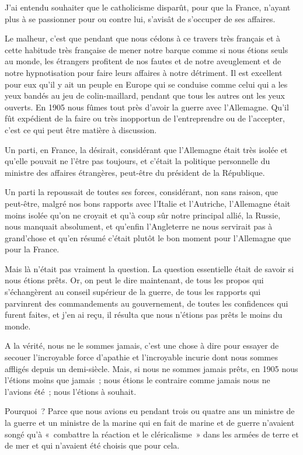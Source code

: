 \documentclass[french,twoside]{book} %
\begin{document}
J’ai entendu souhaiter que le catholicisme disparût, pour que la France, n’ayant plus à se passionner pour ou contre lui, s’avisât de s’occuper de ses affaires.\par
Le malheur, c’est que pendant que nous cédons à ce travers très français et à cette habitude très française de mener notre barque comme si nous étions seuls au monde, les étrangers profitent de nos fautes et de notre aveuglement et de notre hypnotisation pour faire leurs affaires à notre détriment. Il est excellent pour eux qu’il y ait un peuple en Europe qui se conduise comme celui qui a les yeux bandés au jeu de colin-maillard, pendant que tous les autres ont les yeux ouverts. En 1905 nous fûmes tout près d’avoir la guerre avec l’Allemagne. Qu’il fût expédient de la faire ou très inopportun de l’entreprendre ou de l’accepter, c’est ce qui peut être matière à discussion.\par
Un parti, en France, la désirait, considérant que l’Allemagne était très isolée et qu’elle pouvait  ne l’être pas toujours, et c’était la politique personnelle du ministre des affaires étrangères, peut-être du président de la République.\par
Un parti la repoussait de toutes ses forces, considérant, non sans raison, que peut-être, malgré nos bons rapports avec l’Italie et l’Autriche, l’Allemagne était moins isolée qu’on ne croyait et qu’à coup sûr notre principal allié, la Russie, nous manquait absolument, et qu’enfin l’Angleterre ne nous servirait pas à grand’chose et qu’en résumé c’était plutôt le bon moment pour l’Allemagne que pour la France.\par
Mais là n’était pas vraiment la question. La question essentielle était de savoir si nous étions prêts. Or, on peut le dire maintenant, de tous les propos qui s’échangèrent au conseil supérieur de la guerre, de tous les rapports qui parvinrent des commandements au gouvernement, de toutes les confidences qui furent faites, et j’en ai reçu, il résulta que nous n’étions pas prêts le moins du monde.\par
A la vérité, nous ne le sommes jamais, c’est une chose à dire pour essayer de secouer l’incroyable force d’apathie et l’incroyable incurie dont nous sommes affligés depuis un demi-siècle. Mais, si nous ne sommes jamais prêts, en 1905 nous l’étions moins que jamais ; nous étions le contraire comme  jamais nous ne l’avions été ; nous l’étions à souhait.\par
Pourquoi ? Parce que nous avions eu pendant trois ou quatre ans un ministre de la guerre et un ministre de la marine qui en fait de marine et de guerre n’avaient songé qu’à « combattre la réaction et le cléricalisme » dans les armées de terre et de mer et qui n’avaient été choisis que pour cela.\par
\end{document}
